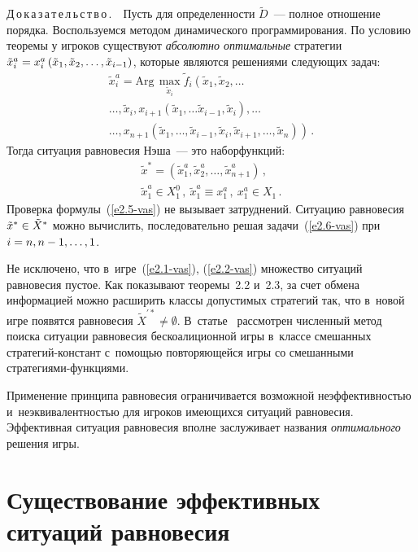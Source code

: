 \begin{multicols}{2}
    \smallskip

    \noindent
    Д\,о\,к\,а\,з\,а\,т\,е\,л\,ь\,с\,т\,в\,о\,.\ \ Пусть для определенности $\tilde{D}$~---
полное отношение порядка. Воспользуемся методом динамического
программирования. По условию теоремы у игроков существуют \textit{абсолютно
оптимальные} стратегии $\tilde{x}_i^a\hm= x_i^a\left( \tilde{x}_1,\tilde{x}_2,\ldots,
\tilde{x}_{i-1}\right)$, которые являются решениями следующих задач:
    \begin{multline}
    \tilde{x}^a_i= \mathrm{Arg}\,\max\limits_{\tilde{x}_i} \tilde{f}_i
    \left( \tilde{x}_1,
    \tilde{x}_2,\ldots{}\right.\\
    \left.{}\ldots, \tilde{x}_{i}, x_{i+1} \left( \tilde{x}_1,
    \ldots\right.
    \tilde{x}_{i-1},\tilde{x}_i\right), \ldots\\
\left.\ldots, x_{n+1}\left( \tilde{x}_1, \ldots,
\tilde{x}_{i-1}, \tilde{x}_i, \tilde{x}_{i+1},\ldots, \tilde{x}_n\right)\right)\,.
    \label{e2.6-vas}
    \end{multline}
Тогда ситуация равновесия Нэша~--- это набор\linebreak функций:
\begin{multline*}
\tilde{x}^*= \left( \tilde{x}^a_1, \tilde{x}^a_2, \ldots, \tilde{x}^a_{n+1}\right)\,,\\
\tilde{x}^a_1\in X_1^0\,,\  \tilde{x}^a_1\equiv x_1^a\,,\ x_1^a\in X_1\,.
\end{multline*}
Проверка формулы~(\ref{e2.5-vas}) не вызывает затруднений. Ситуацию равновесия
$\tilde{x}^*\hm\in \tilde{X}^*$ можно вы\-чис\-лить, последовательно решая
задачи~(\ref{e2.6-vas}) при $i\hm= n, n-1, \ldots , 1$.

    Не исключено, что в~игре~(\ref{e2.1-vas}), (\ref{e2.2-vas}) множество ситуаций
равновесия пустое. Как показывают теоремы~2.2 и~2.3, за счет обмена
информацией можно расширить классы допустимых стратегий так, что в~новой игре
появятся равновесия $\tilde{X}^{\prime *}\not= \emptyset$. \mbox{В~статье}~\cite{13-vas}
рассмотрен численный метод поиска ситуации равновесия бескоалиционной игры
в~классе смешанных стра\-те\-гий-констант с~по\-мощью повторяющейся игры со
смешанными стра\-те\-ги\-ями-функ\-ци\-ями.

    Применение принципа равновесия ограничивается возможной
неэффективностью и~неэквивалентностью для игроков имеющихся ситуаций
равновесия. Эффективная ситуация равновесия вполне заслуживает названия
\textit{оптимального} решения игры.

\section{Существование эффективных ситуаций равновесия}


\end{multicols}
